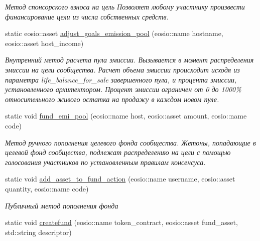 \begin{DoxyCompactItemize}
\begin{DoxyCompactList}\small\item\em Метод спонсорского взноса на цель Позволяет любому участнику произвести финансирование цели из числа собственных средств. \end{DoxyCompactList}\item 
static eosio\+::asset \mbox{\hyperlink{classunicore_aacdeaae7b4b591419bd366661b92cd27}{adjust\+\_\+goals\+\_\+emission\+\_\+pool}} (eosio\+::name hostname, eosio\+::asset host\+\_\+income)
\begin{DoxyCompactList}\small\item\em Внутренний метод расчета пула эмиссии. Вызывается в момент распределения эмиссии на цели сообщества. Расчет объема эмиссии происходит исходя из параметра life\+\_\+balance\+\_\+for\+\_\+sale завершенного пула, и процента эмиссии, установленного архитектором. Процент эмиссии ограничен от 0 до 1000\% относительного живого остатка на продажу в каждом новом пуле. \end{DoxyCompactList}\item 
static void \mbox{\hyperlink{classunicore_a416ca740d83132d969c0e99d035a5c7f}{fund\+\_\+emi\+\_\+pool}} (eosio\+::name host, eosio\+::asset amount, eosio\+::name code)
\begin{DoxyCompactList}\small\item\em Метод ручного пополнения целевого фонда сообщества. Жетоны, попадающие в целевой фонд сообщества, подлежат распределению на цели с помощью голосования участников по установленным правилам консенсуса. \end{DoxyCompactList}\item 
\mbox{\label{classunicore_aac61e7c884c079854b1987c88abce0c5}} 
static void \mbox{\hyperlink{classunicore_aac61e7c884c079854b1987c88abce0c5}{add\+\_\+asset\+\_\+to\+\_\+fund\+\_\+action}} (eosio\+::name username, eosio\+::asset quantity, eosio\+::name code)
\begin{DoxyCompactList}\small\item\em Публичный метод пополнения фонда \end{DoxyCompactList}\item 
\mbox{\label{classunicore_a2439f37a892708018e3474efa938d778}} 
static void \mbox{\hyperlink{classunicore_a2439f37a892708018e3474efa938d778}{createfund}} (eosio\+::name token\+\_\+contract, eosio\+::asset fund\+\_\+asset, std\+::string descriptor)

\end{DoxyCompactItemize}
